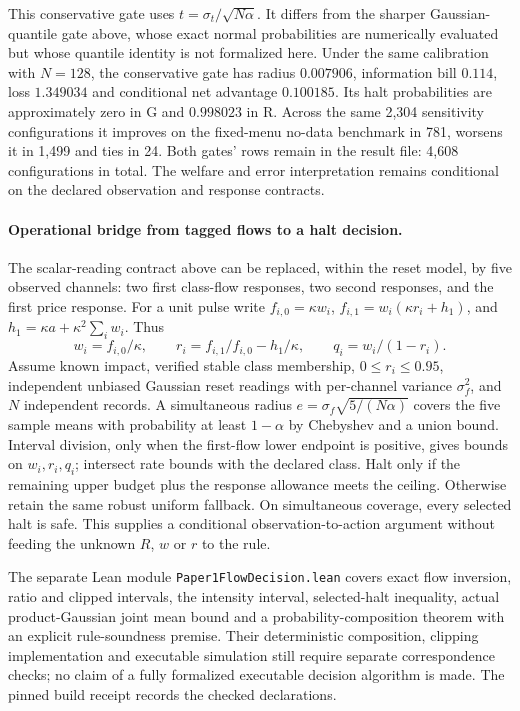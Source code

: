 \documentclass[12pt]{article}
\theoremstyle{definition}
\theoremstyle{remark}
\begin{document}
This conservative gate uses $t=\sigma_t/\sqrt{N\alpha}$. It differs from the sharper Gaussian-quantile gate above, whose exact normal probabilities are numerically evaluated but whose quantile identity is not formalized here. Under the same calibration with $N=128$, the conservative gate has radius $0.007906$, information bill $0.114$, loss $1.349034$ and conditional net advantage $0.100185$. Its halt probabilities are approximately zero in G and $0.998023$ in R. Across the same 2,304 sensitivity configurations it improves on the fixed-menu no-data benchmark in 781, worsens it in 1,499 and ties in 24. Both gates' rows remain in the result file: 4,608 configurations in total. The welfare and error interpretation remains conditional on the declared observation and response contracts.

\paragraph{Operational bridge from tagged flows to a halt decision.}
The scalar-reading contract above can be replaced, within the reset model, by five observed channels: two first class-flow responses, two second responses, and the first price response. For a unit pulse write $f_{i,0}=\kappa w_i$, $f_{i,1}=w_i(\kappa r_i+h_1)$, and $h_1=\kappa a+\kappa^2\sum_iw_i$. Thus
\[
 w_i=f_{i,0}/\kappa,\qquad r_i=f_{i,1}/f_{i,0}-h_1/\kappa,\qquad q_i=w_i/(1-r_i).
\]
Assume known impact, verified stable class membership, $0\le r_i\le0.95$, independent unbiased Gaussian reset readings with per-channel variance $\sigma_f^2$, and $N$ independent records. A simultaneous radius $e=\sigma_f\sqrt{5/(N\alpha)}$ covers the five sample means with probability at least $1-\alpha$ by Chebyshev and a union bound. Interval division, only when the first-flow lower endpoint is positive, gives bounds on $w_i,r_i,q_i$; intersect rate bounds with the declared class. Halt only if the remaining upper budget plus the response allowance meets the ceiling. Otherwise retain the same robust uniform fallback. On simultaneous coverage, every selected halt is safe. This supplies a conditional observation-to-action argument without feeding the unknown $R$, $w$ or $r$ to the rule.

The separate Lean module \nolinkurl{Paper1FlowDecision.lean} covers exact flow inversion, ratio and clipped intervals, the intensity interval, selected-halt inequality, actual product-Gaussian joint mean bound and a probability-composition theorem with an explicit rule-soundness premise. Their deterministic composition, clipping implementation and executable simulation still require separate correspondence checks; no claim of a fully formalized executable decision algorithm is made. The pinned build receipt records the checked declarations.
\end{document}
